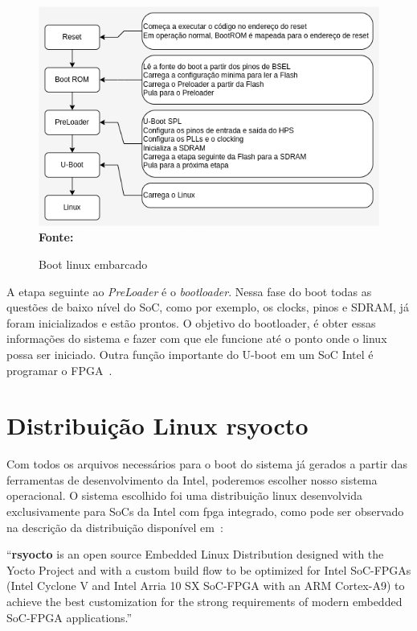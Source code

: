 \begin{figure}[ht]
	\caption{Boot linux embarcado}
	\begin{center}
		\includegraphics[scale=0.65]{imagens/embeddedLinux.png}\\
		{\small \textbf{Fonte:}\cite{SocLinux}}
    \end{center}\label{fig:linux}
\end{figure}

A etapa seguinte ao \textit{PreLoader} é o \textit{bootloader}. Nessa fase do boot todas as questões de baixo nível do SoC, como por exemplo, os clocks, pinos e SDRAM, já foram inicializados e estão prontos. O objetivo do bootloader, é obter essas informações do sistema e fazer com que ele funcione até o ponto onde o linux possa ser iniciado. Outra função importante do U-boot em um SoC Intel é programar o FPGA~\cite{SocLinux}.

\section{Distribuição Linux rsyocto}
Com todos os arquivos necessários para o boot do sistema já gerados a partir das ferramentas de desenvolvimento da Intel, poderemos escolher nosso sistema operacional. O sistema escolhido foi uma distribuição linux desenvolvida exclusivamente para SoCs da Intel com fpga integrado, como pode ser observado na descrição da distribuição disponível em~\cite{rsyocto}:

\begin{citacao}
	``\textbf{rsyocto} is an open source Embedded Linux Distribution designed with the Yocto Project and with a custom build flow to be optimized for Intel SoC-FPGAs (Intel Cyclone V and Intel Arria 10 SX SoC-FPGA with an ARM Cortex-A9) to achieve the best customization for the strong requirements of modern embedded SoC-FPGA applications.''
\end{citacao} 

